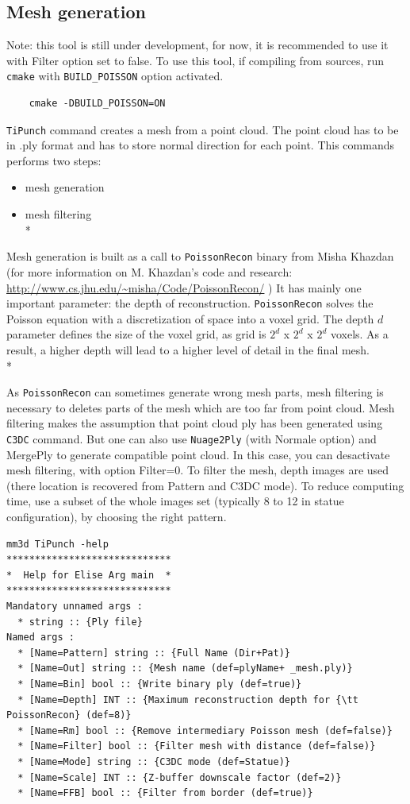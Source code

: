 \subsection{Mesh generation}

Note: this tool is still under development, for now, it is recommended to use it with Filter option set to false. To use this tool, if compiling from sources, run {\tt cmake} with {\tt BUILD\_POISSON} option activated.
\begin{verbatim}
    cmake -DBUILD_POISSON=ON
\end{verbatim}

{\tt TiPunch} command creates a mesh from a point cloud. The point cloud has to be in .ply format and has to store normal direction for each point.
This commands performs two steps:
\begin{itemize}
\item mesh generation
\item mesh filtering\\*
\end{itemize}
Mesh generation is built as a call to {\tt PoissonRecon} binary from Misha Khazdan (for more information on M. Khazdan's code and research: \url{http://www.cs.jhu.edu/~misha/Code/PoissonRecon/} )
It has mainly one important parameter: the depth of reconstruction. {\tt PoissonRecon} solves the Poisson equation with a discretization of space into a voxel grid. The depth $d$ parameter defines the size of the voxel grid, as grid is $2^d$ x $2^d$ x $2^d$ voxels.
As a result, a higher depth will lead to a higher level of detail in the final mesh.\\*

As {\tt PoissonRecon} can sometimes generate wrong mesh parts, mesh filtering is necessary to deletes parts of the mesh which are too far from point cloud.
Mesh filtering makes the assumption that point cloud ply has been generated using {\tt C3DC} command. But one can also use {\tt Nuage2Ply} (with Normale option) and MergePly to generate compatible point cloud. In this case, you can desactivate mesh filtering, with option Filter=0.
To filter the mesh, depth images are used (there location is recovered from Pattern and C3DC mode). To reduce computing time, use a subset of the whole images set (typically 8 to 12 in statue configuration), by choosing the right pattern.

\begin{verbatim}
mm3d TiPunch -help
*****************************
*  Help for Elise Arg main  *
*****************************
Mandatory unnamed args :
  * string :: {Ply file}
Named args :
  * [Name=Pattern] string :: {Full Name (Dir+Pat)}
  * [Name=Out] string :: {Mesh name (def=plyName+ _mesh.ply)}
  * [Name=Bin] bool :: {Write binary ply (def=true)}
  * [Name=Depth] INT :: {Maximum reconstruction depth for {\tt PoissonRecon} (def=8)}
  * [Name=Rm] bool :: {Remove intermediary Poisson mesh (def=false)}
  * [Name=Filter] bool :: {Filter mesh with distance (def=false)}
  * [Name=Mode] string :: {C3DC mode (def=Statue)}
  * [Name=Scale] INT :: {Z-buffer downscale factor (def=2)}
  * [Name=FFB] bool :: {Filter from border (def=true)}
\end{verbatim}

